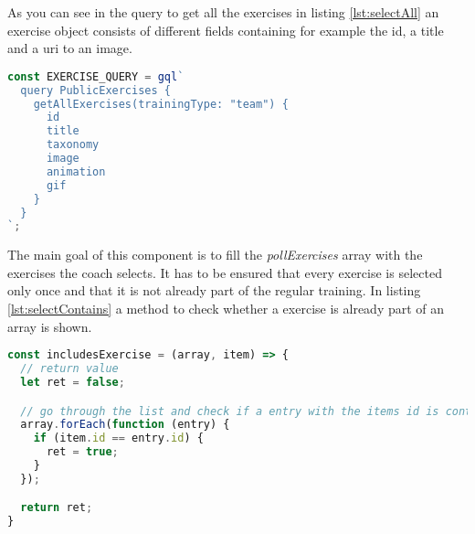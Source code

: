 As you can see in the query to get all the exercises in listing \ref{lst:selectAll} an exercise object consists of different fields containing for example the id, a title and a uri to an image.

\begin{lstlisting}[language=javascript, caption=\textit{GraphQL} Query AllExercises, label=lst:selectAll]
const EXERCISE_QUERY = gql`
  query PublicExercises {
    getAllExercises(trainingType: "team") {
      id
      title
      taxonomy
      image
      animation
      gif
    }
  }
`;
\end{lstlisting}

The main goal of this component is to fill the \textit{pollExercises} array with the exercises the coach selects. It has to be ensured that every exercise is selected only once and that it is not already part of the regular training. In listing \ref{lst:selectContains} a method to check whether a exercise is already part of an array is shown.
\begin{lstlisting}[language=javascript, caption=Check Include Method, label=lst:selectContains]
const includesExercise = (array, item) => {
  // return value
  let ret = false;

  // go through the list and check if a entry with the items id is contained
  array.forEach(function (entry) {
    if (item.id == entry.id) {
      ret = true;
    }
  });

  return ret;
}
\end{lstlisting}

